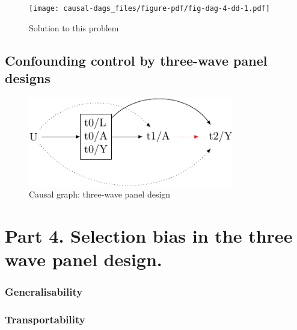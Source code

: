 \documentclass[
  singlecolumn]{report}
\begin{document}
\begin{figure}

{\centering \texttt{[image: causal-dags\_files/figure-pdf/fig-dag-4-dd-1.pdf]}

}

\caption{\label{fig-dag-4-dd}Solution to this problem}

\end{figure}

\hypertarget{confounding-control-by-three-wave-panel-designs}{%
\subsection{Confounding control by three-wave panel
designs}\label{confounding-control-by-three-wave-panel-designs}}

\begin{figure}

{\centering \includegraphics[width=0.8\textwidth,height=\textheight]{causal-dags_files/figure-pdf/fig-dag-6-1.pdf}

}

\caption{\label{fig-dag-6}Causal graph: three-wave panel design}

\end{figure}

\hypertarget{part-4.-selection-bias-in-the-three-wave-panel-design.}{%
\section{Part 4. Selection bias in the three wave panel
design.}\label{part-4.-selection-bias-in-the-three-wave-panel-design.}}

\hypertarget{generalisability}{%
\subsubsection{Generalisability}\label{generalisability}}

\hypertarget{transportability}{%
\subsubsection{Transportability}\label{transportability}}
\end{document}

